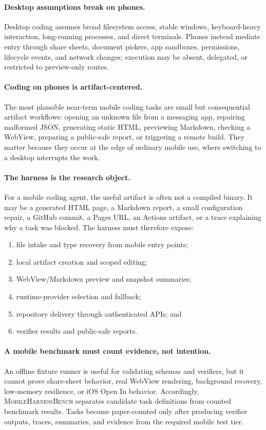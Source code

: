 \documentclass{article}
\newcommand{\mhb}{\textsc{MobileHarnessBench}}
\begin{document}
\paragraph{Desktop assumptions break on phones.}
Desktop coding assumes broad filesystem access, stable windows, keyboard-heavy interaction, long-running processes, and direct terminals.
Phones instead mediate entry through share sheets, document pickers, app sandboxes, permissions, lifecycle events, and network changes; execution may be absent, delegated, or restricted to preview-only routes.

\paragraph{Coding on phones is artifact-centered.}
The most plausible near-term mobile coding tasks are small but consequential artifact workflows: opening an unknown file from a messaging app, repairing malformed JSON, generating static HTML, previewing Markdown, checking a WebView, preparing a public-safe report, or triggering a remote build.
They matter because they occur at the edge of ordinary mobile use, where switching to a desktop interrupts the work.

\paragraph{The harness is the research object.}
For a mobile coding agent, the useful artifact is often not a compiled binary.
It may be a generated HTML page, a Markdown report, a small configuration repair, a GitHub commit, a Pages URL, an Actions artifact, or a trace explaining why a task was blocked.
The harness must therefore expose:
\begin{enumerate}[leftmargin=1.5em]
    \item file intake and type recovery from mobile entry points;
    \item local artifact creation and scoped editing;
    \item WebView/Markdown preview and snapshot summaries;
    \item runtime-provider selection and fallback;
    \item repository delivery through authenticated APIs; and
    \item verifier results and public-safe reports.
\end{enumerate}

\paragraph{A mobile benchmark must count evidence, not intention.}
An offline fixture runner is useful for validating schemas and verifiers, but it cannot prove share-sheet behavior, real WebView rendering, background recovery, low-memory resilience, or iOS Open In behavior.
Accordingly, \mhb{} separates candidate task definitions from counted benchmark results.
Tasks become paper-counted only after producing verifier outputs, traces, summaries, and evidence from the required mobile test tier.
\end{document}

